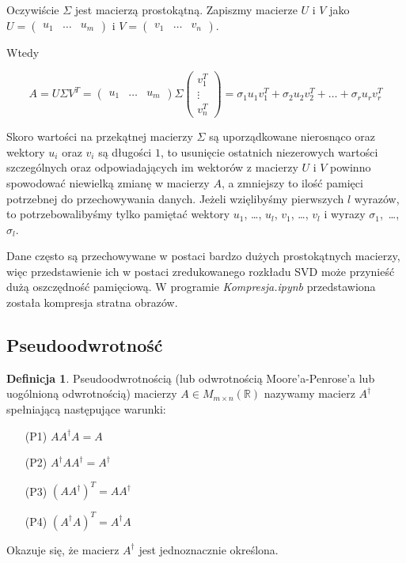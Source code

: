 \documentclass{article}
\theoremstyle{definition}
\newtheorem{definition}[theorem]{Definicja}
\begin{document}
Oczywiście $\Sigma$ jest macierzą prostokątną.
Zapiszmy macierze $U$ i $V$ jako $U = \begin{pmatrix} u_1 & \ldots & u_m \end{pmatrix}$ i $V = \begin{pmatrix} v_1 & \ldots & v_n \end{pmatrix}$.

Wtedy

$$ A = U \Sigma V^T = \begin{pmatrix} u_1 & \ldots & u_m \end{pmatrix} \Sigma \begin{pmatrix}
v_1^T \\ \vdots \\ v_n^T
\end{pmatrix} = \sigma_1 u_1 v_1^T + \sigma_2 u_2 v_2^T + \ldots + \sigma_r u_r v_r^T  $$


Skoro wartości na przekątnej macierzy $\Sigma$ są uporządkowane nierosnąco oraz wektory $u_i$ oraz $v_i$ są długości $1$, to usunięcie ostatnich niezerowych wartości szczególnych oraz odpowiadających im wektorów z macierzy $U$ i $V$ powinno spowodować niewielką zmianę w macierzy $A$, a zmniejszy to ilość pamięci potrzebnej do przechowywania danych. Jeżeli wzięlibyśmy pierwszych $l$ wyrazów, to potrzebowalibyśmy tylko pamiętać wektory $u_1$, \ldots, $u_l$, $v_1$, \ldots, $v_l$ i wyrazy $\sigma_1$,~\ldots,~$\sigma_l$.

Dane często są przechowywane w postaci bardzo dużych prostokątnych macierzy, więc przedstawienie ich w postaci zredukowanego rozkładu SVD może przynieść dużą oszczędność pamięciową. W programie \textit{Kompresja.ipynb} przedstawiona została kompresja stratna obrazów.

\subsection{Pseudoodwrotność}

\begin{definition}
Pseudoodwrotnością (lub odwrotnością Moore'a-Penrose'a lub uogólnioną odwrotnością) macierzy $A \in M_{m \times n} (\mathbb{R})$ nazywamy macierz $A^\dag$ spełniającą następujące warunki:
\begin{itemize}
    \item[(P1)] $AA^\dag A = A$
    \item[(P2)] $A^\dag A A^\dag = A^\dag$
    \item[(P3)] $(AA^\dag)^T = AA^\dag$
    \item[(P4)] $(A^\dag A)^T = A^\dag A$
\end{itemize}
Okazuje się, że macierz $A^\dag$ jest jednoznacznie określona. 
\end{definition}
\end{document}
